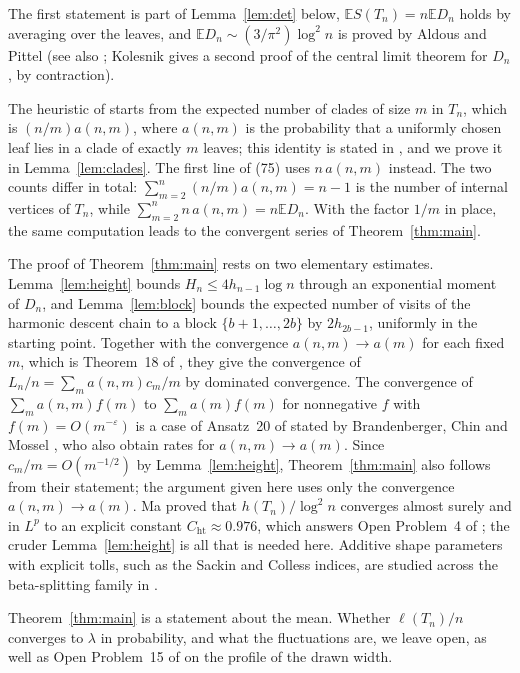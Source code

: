 \documentclass[11pt]{amsart}
\theoremstyle{remark}
\numberwithin{equation}{section}
\newcommand{\E}{\mathbb E}
\begin{document}
The first statement is part of Lemma~\ref{lem:det} below, $\E S(T_n)=n\E D_n$ holds by averaging over the leaves, and $\E D_n\sim(3/\pi^2)\log^2n$ is proved by Aldous and Pittel \cite{AP25} (see also \cite[Theorem 3]{AJ23}; Kolesnik \cite{Kol25} gives a second proof of the central limit theorem for $D_n$, by contraction).

The heuristic of \cite[(75)]{AJ23} starts from the expected number of clades of size $m$ in $T_n$, which is $(n/m)a(n,m)$, where $a(n,m)$ is the probability that a uniformly chosen leaf lies in a clade of exactly $m$ leaves; this identity is stated in \cite[Section 4.8]{AJ23}, and we prove it in Lemma~\ref{lem:clades}. The first line of (75) uses $n\,a(n,m)$ instead. The two counts differ in total: $\sum_{m=2}^n(n/m)a(n,m)=n-1$ is the number of internal vertices of $T_n$, while $\sum_{m=2}^n n\,a(n,m)=n\E D_n$. With the factor $1/m$ in place, the same computation leads to the convergent series of Theorem~\ref{thm:main}.

The proof of Theorem~\ref{thm:main} rests on two elementary estimates. Lemma~\ref{lem:height} bounds $H_n\le4h_{n-1}\log n$ through an exponential moment of $D_n$, and Lemma~\ref{lem:block} bounds the expected number of visits of the harmonic descent chain to a block $\{b+1,\dots,2b\}$ by $2h_{2b-1}$, uniformly in the starting point. Together with the convergence $a(n,m)\to a(m)$ for each fixed $m$, which is Theorem~18 of \cite{AJ23}, they give the convergence of $L_n/n=\sum_ma(n,m)c_m/m$ by dominated convergence. The convergence of $\sum_ma(n,m)f(m)$ to $\sum_ma(m)f(m)$ for nonnegative $f$ with $f(m)=O(m^{-\varepsilon})$ is a case of Ansatz~20 of \cite{AJ23} stated by Brandenberger, Chin and Mossel \cite[Section 1.1]{BCM25}, who also obtain rates for $a(n,m)\to a(m)$. Since $c_m/m=O(m^{-1/2})$ by Lemma~\ref{lem:height}, Theorem~\ref{thm:main} also follows from their statement; the argument given here uses only the convergence $a(n,m)\to a(m)$. Ma \cite{Ma26} proved that $h(T_n)/\log^2n$ converges almost surely and in $L^p$ to an explicit constant $C_{\mathrm{ht}}\approx0.976$, which answers Open Problem~4 of \cite{AJ23}; the cruder Lemma~\ref{lem:height} is all that is needed here. Additive shape parameters with explicit tolls, such as the Sackin and Colless indices, are studied across the beta-splitting family in \cite{Son26}.

Theorem~\ref{thm:main} is a statement about the mean. Whether $\ell(T_n)/n$ converges to $\lambda$ in probability, and what the fluctuations are, we leave open, as well as Open Problem~15 of \cite{AJ23} on the profile of the drawn width.
\end{document}
